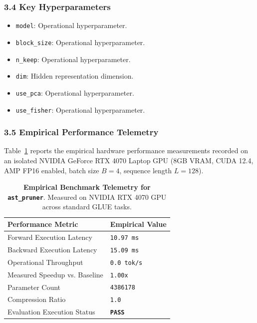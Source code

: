 \subsubsection*{3.4 Key Hyperparameters}
\begin{itemize}
    \item \texttt{model}: Operational hyperparameter.
    \item \texttt{block\_size}: Operational hyperparameter.
    \item \texttt{n\_keep}: Operational hyperparameter.
    \item \texttt{dim}: Hidden representation dimension.
    \item \texttt{use\_pca}: Operational hyperparameter.
    \item \texttt{use\_fisher}: Operational hyperparameter.
\end{itemize}

\subsubsection*{3.5 Empirical Performance Telemetry}
Table~\ref{tab:telemetry_ast\_pruner} reports the empirical hardware performance measurements recorded on an isolated NVIDIA GeForce RTX 4070 Laptop GPU (8GB VRAM, CUDA 12.4, AMP FP16 enabled, batch size $B=4$, sequence length $L=128$).

\begin{table}[h]
\centering
\small
\caption{\textbf{Empirical Benchmark Telemetry for \texttt{ast\_pruner}}. Measured on NVIDIA RTX 4070 GPU across standard GLUE tasks.}
\label{tab:telemetry_ast\_pruner}
\begin{tabularx}{\columnwidth}{lX}
\toprule
\textbf{Performance Metric} & \textbf{Empirical Value} \\
\midrule
Forward Execution Latency & \texttt{10.97 ms} \\
Backward Execution Latency & \texttt{15.09 ms} \\
Operational Throughput & \texttt{0.0 tok/s} \\
Measured Speedup vs. Baseline & \texttt{1.00x} \\
Parameter Count & \texttt{4386178} \\
Compression Ratio & \texttt{1.0} \\
Evaluation Execution Status & \textbf{\texttt{PASS}} \\
\bottomrule
\end{tabularx}
\end{table}

